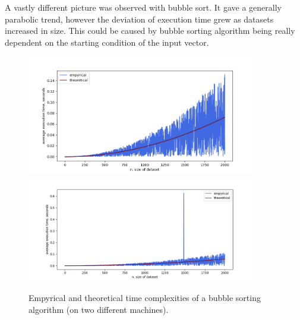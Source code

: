 \documentclass[12pt, a4paper]{article}
\begin{document}
A vastly different picture was observed with bubble sort. It gave a generally parabolic trend, however the deviation of execution time grew as datasets increased in size. This could be caused by bubble sorting algorithm being really dependent on the starting condition of the input vector.
\begin{figure}[!h]
\centering
\includegraphics[width=0.9\textwidth]{bubblesort.png}
\includegraphics[width=0.9\textwidth]{valeria/bubblesort.png}
\caption{Empyrical and theoretical time complexities of a bubble sorting algorithm (on two different machines).}
\end{figure}

\newpage
\end{document}
